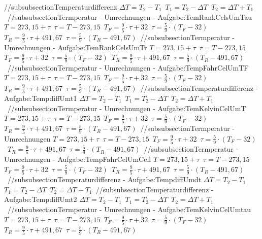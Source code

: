 //subsubsection{Temperaturdifferenz} 
$ \Delta T = T_{2}  - T_{1} $\ 
$ T_{1}  = T_{2}  - \Delta T $\ 
$ T_{2}  = \Delta T + T_{1} $\ 
//subsubsection{Termperatur - Umrechnungen - Aufgabe:TemRankCelsUmTau} 
$ T = 273,15 + \tau $\ 
$ \tau  = T-273,15 $\ 
$ T_{F}  = \frac{9}{5}\cdot \tau  +32 $\ 
$ \tau  = \frac{5}{9}\cdot (T_{F}  - 32) $\ 
$ T_{R}  = \frac{9}{5}\cdot \tau  + 491,67 $\ 
$ \tau  = \frac{5}{9}\cdot (T_{R}  - 491,67) $\ 
//subsubsection{Termperatur - Umrechnungen - Aufgabe:TemRankCelsUmTr} 
$ T = 273,15 + \tau $\ 
$ \tau  = T-273,15 $\ 
$ T_{F}  = \frac{9}{5}\cdot \tau  +32 $\ 
$ \tau  = \frac{5}{9}\cdot (T_{F}  - 32) $\ 
$ T_{R}  = \frac{9}{5}\cdot \tau  + 491,67 $\ 
$ \tau  = \frac{5}{9}\cdot (T_{R}  - 491,67) $\ 
//subsubsection{Termperatur - Umrechnungen - Aufgabe:TempFahrCelUmTF} 
$ T = 273,15 + \tau $\ 
$ \tau  = T-273,15 $\ 
$ T_{F}  = \frac{9}{5}\cdot \tau  +32 $\ 
$ \tau  = \frac{5}{9}\cdot (T_{F}  - 32) $\ 
$ T_{R}  = \frac{9}{5}\cdot \tau  + 491,67 $\ 
$ \tau  = \frac{5}{9}\cdot (T_{R}  - 491,67) $\ 
//subsubsection{Temperaturdifferenz - Aufgabe:TempdiffUmt1} 
$ \Delta T = T_{2}  - T_{1} $\ 
$ T_{1}  = T_{2}  - \Delta T $\ 
$ T_{2}  = \Delta T + T_{1} $\ 
//subsubsection{Termperatur - Umrechnungen - Aufgabe:TemKelvinCelUmT} 
$ T = 273,15 + \tau $\ 
$ \tau  = T-273,15 $\ 
$ T_{F}  = \frac{9}{5}\cdot \tau  +32 $\ 
$ \tau  = \frac{5}{9}\cdot (T_{F}  - 32) $\ 
$ T_{R}  = \frac{9}{5}\cdot \tau  + 491,67 $\ 
$ \tau  = \frac{5}{9}\cdot (T_{R}  - 491,67) $\ 
//subsubsection{Termperatur - Umrechnungen} 
$ T = 273,15 + \tau $\ 
$ \tau  = T-273,15 $\ 
$ T_{F}  = \frac{9}{5}\cdot \tau  +32 $\ 
$ \tau  = \frac{5}{9}\cdot (T_{F}  - 32) $\ 
$ T_{R}  = \frac{9}{5}\cdot \tau  + 491,67 $\ 
$ \tau  = \frac{5}{9}\cdot (T_{R}  - 491,67) $\ 
//subsubsection{Termperatur - Umrechnungen - Aufgabe:TempFahrCelUmCell} 
$ T = 273,15 + \tau $\ 
$ \tau  = T-273,15 $\ 
$ T_{F}  = \frac{9}{5}\cdot \tau  +32 $\ 
$ \tau  = \frac{5}{9}\cdot (T_{F}  - 32) $\ 
$ T_{R}  = \frac{9}{5}\cdot \tau  + 491,67 $\ 
$ \tau  = \frac{5}{9}\cdot (T_{R}  - 491,67) $\ 
//subsubsection{Temperaturdifferenz - Aufgabe:TempdiffUmdt} 
$ \Delta T = T_{2}  - T_{1} $\ 
$ T_{1}  = T_{2}  - \Delta T $\ 
$ T_{2}  = \Delta T + T_{1} $\ 
//subsubsection{Temperaturdifferenz - Aufgabe:TempdiffUmt2} 
$ \Delta T = T_{2}  - T_{1} $\ 
$ T_{1}  = T_{2}  - \Delta T $\ 
$ T_{2}  = \Delta T + T_{1} $\ 
//subsubsection{Termperatur - Umrechnungen - Aufgabe:TemKelvinCelUmtau} 
$ T = 273,15 + \tau $\ 
$ \tau  = T-273,15 $\ 
$ T_{F}  = \frac{9}{5}\cdot \tau  +32 $\ 
$ \tau  = \frac{5}{9}\cdot (T_{F}  - 32) $\ 
$ T_{R}  = \frac{9}{5}\cdot \tau  + 491,67 $\ 
$ \tau  = \frac{5}{9}\cdot (T_{R}  - 491,67) $\ 

